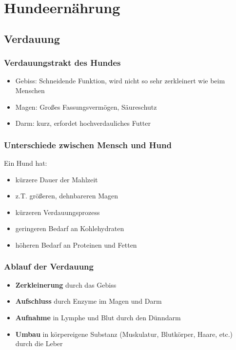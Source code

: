 \chapter{Hundeernährung}


\section{Verdauung}

    \subsection{Verdauungstrakt des Hundes}
    \begin{itemize}
        \item Gebiss: Schneidende Funktion, wird nicht so sehr zerkleinert wie beim Menschen
        \item Magen: Großes Fassungsvermögen, Säureschutz
        \item Darm: kurz, erfordet hochverdauliches Futter
    \end{itemize}

    \subsection{Unterschiede zwischen Mensch und Hund}
    Ein Hund hat:
    \begin{itemize}
        \item kürzere Dauer der Mahlzeit
        \item z.T. größeren, dehnbareren Magen
        \item kürzeren Verdauungsprozess
        \item geringeren Bedarf an Kohlehydraten
        \item höheren Bedarf an Proteinen und Fetten
    \end{itemize}

    \subsection{Ablauf der Verdauung}
    \begin{itemize}
        \item \textbf{Zerkleinerung} durch das Gebiss
        \item \textbf{Aufschluss} durch Enzyme im Magen und Darm
        \item \textbf{Aufnahme} in Lymphe und Blut durch den Dünndarm
        \item \textbf{Umbau} in körpereigene Substanz (Muskulatur, Blutkörper, Haare, etc.) durch die Leber
    \end{itemize}


